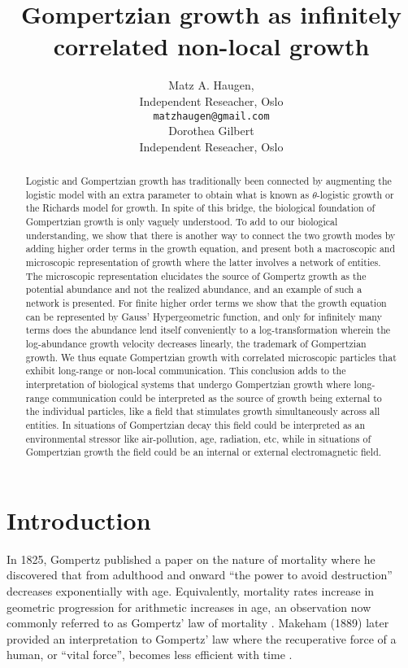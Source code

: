 \documentclass{article}
\title{Gompertzian growth as infinitely correlated non-local growth}
\author{Matz A. Haugen, \\
Independent Reseacher, Oslo\\
\texttt{matzhaugen@gmail.com} \\
  \And
  Dorothea Gilbert \\
  Independent Reseacher, Oslo\\
}
\begin{document}
\maketitle

\begin{abstract}
Logistic and Gompertzian growth has traditionally been connected by augmenting the logistic model with an extra parameter to obtain what is known as $\theta$-logistic growth or the Richards model for growth. In spite of this bridge, the biological foundation of Gompertzian growth is only vaguely understood. To add to our biological understanding, we show that there is another way to connect the two growth modes by adding higher order terms in the growth equation, and present both a macroscopic and microscopic representation of growth where the latter involves a network of entities. The microscopic representation elucidates the source of Gompertz growth as the potential abundance and not the realized abundance, and an example of such a network is presented. For finite higher order terms we show that the growth equation can be represented by Gauss' Hypergeometric function, and only for infinitely many terms does the abundance lend itself conveniently to a log-transformation wherein the log-abundance growth velocity decreases linearly, the trademark of Gompertzian growth. We thus equate Gompertzian growth with correlated microscopic particles that exhibit long-range or non-local communication. This conclusion adds to the interpretation of biological systems that undergo Gompertzian growth where long-range communication could be interpreted as the source of growth being external to the individual particles, like a field that stimulates growth simultaneously across all entities. In situations of Gompertzian decay this field could be interpreted as an environmental stressor like air-pollution, age, radiation, etc, while in situations of Gompertzian growth the field could be an internal or external electromagnetic field.
\end{abstract}


\section{Introduction}

In 1825, Gompertz published a paper on the nature of mortality where he discovered that from adulthood and onward ``the power to avoid destruction'' decreases exponentially with age. Equivalently, mortality rates increase in geometric progression for arithmetic increases in age, an observation now commonly referred to as Gompertz' law of mortality \cite{Gompertz1825}. Makeham (1889) later provided an interpretation to Gompertz' law where the recuperative force of a human, or ``vital force'', becomes less efficient with time \cite{makeham1889further}. 
\end{document}

